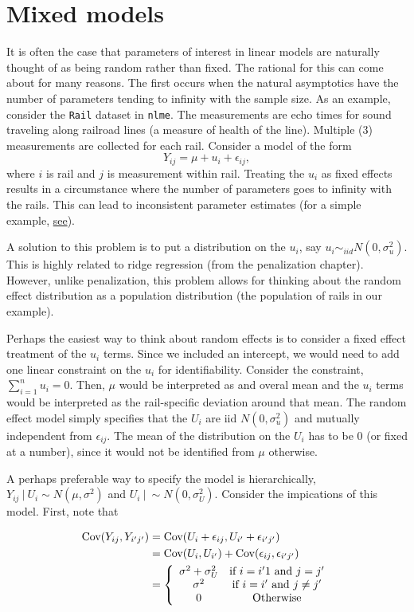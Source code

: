 \chapter{Mixed models}


It is often the case that parameters of interest in linear
models are naturally thought of as being random rather
than fixed. The rational for this can come about for many reasons.
The first occurs when the natural asymptotics have the number
of parameters tending to infinity with the sample size. As
an example, consider the \texttt{Rail} dataset in
\texttt{nlme}. The measurements are echo times for sound
traveling along railroad lines (a measure of health of the
line). Multiple (3) measurements are collected for each rail.
Consider a model of the form
$$
Y_{ij} = \mu + u_i + \epsilon_{ij},
$$
where $i$ is rail and $j$ is measurement within rail. 
Treating the $u_i$ as fixed effects results in a
circumstance where the number of parameters goes
to infinity with the rails. This can lead to 
inconsistent parameter estimates \citep{neyman1948consistent}
(for a simple example, 
\href{http://www.stat.berkeley.edu/~census/neyscpar.pdf}{see}). 

A solution to this problem is to put a distribution on
the $u_i$, say $u_i \sim_{iid} N(0, \sigma^2_u)$. This
is highly related to ridge regression (from the penalization
chapter). However, unlike penalization, this problem allows
for thinking about the random effect distribution as a population
distribution (the population of rails in our example). 

Perhaps the easiest way to think about random effects is to
consider a fixed effect treatment of the $u_i$ terms. Since
we included an intercept, we would need to add one linear
constraint on the $u_i$ for identifiability. Consider the
constraint, $\sum_{i=1}^n u_i = 0$. Then, $\mu$ would be
interpreted as and overal mean and the $u_i$ terms would
be interpreted as the rail-specific deviation around
that mean. The random effect model simply specifies that
the $U_i$ are iid $N(0, \sigma^2_u)$ and mutually
independent from $\epsilon_{ij}$. The mean of the distribution
on the $U_i$ has to be 0 (or fixed at a number), since it would
not be identified from $\mu$ otherwise. 

A perhaps preferable
way to specify the model is hierarchically, 
$Y_{ij} ~|~ U_i \sim N(\mu, \sigma^2)$ and $U_i ~|~ \sim N(0, \sigma^2_U)$. 
Consider the impications of this model. First, note that

\begin{align}
\mbox{Cov}(Y_{ij}, Y_{i'j'}) & = \mbox{Cov}(U_i + \epsilon_{ij}, U_{i'} + \epsilon_{i'j'})\\
& = \mbox{Cov}(U_i, U_{i'}) + \mbox{Cov}(\epsilon_{ij}, \epsilon_{i'j'}) \\
& = \left\{
\begin{array}{cc}
\sigma^2 + \sigma^2_U & \mbox{if}~ i=i'1 ~\mbox{and}~ j = j' \\
\sigma^2 & \mbox{if}~ i=i' ~\mbox{and}~ j\neq j' \\
0 & \mbox{Otherwise}
\end{array}
\right.
\end{align}

